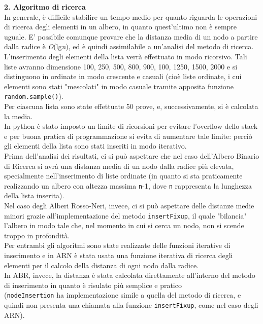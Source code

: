 \documentclass[]{article}
\begin{document}
{\Large \textbf{2. Algoritmo di ricerca}}\\
In generale, è difficile stabilire un tempo medio per quanto riguarda le operazioni di ricerca degli elementi in un albero, 
in quanto quest'ultimo non è sempre uguale. E' possibile comunque provare che la distanza media di un nodo a partire dalla radice è \textit{O}(lg\textit{n}), 
ed è quindi assimilabile a un'analisi del metodo di ricerca.\\
L'inserimento degli elementi della lista verrà effettuato in modo ricorsivo. 
Tali liste avranno dimensione 100, 250, 500, 800, 900, 100, 1250, 1500, 2000 e si distinguono in ordinate in modo crescente e casuali 
(cioè liste ordinate, i cui elementi sono stati "mescolati" in modo casuale tramite apposita funzione \texttt{random.sample()}).\\
Per ciascuna lista sono state effettuate 50 prove, e, successivamente, si è calcolata la media.\\
In python è stato imposto un limite di ricorsioni per evitare l'overflow dello stack e per buona pratica di programmazione si evita di aumentare tale limite:
perciò gli elementi della lista sono stati inseriti in modo iterativo.\\
Prima dell'analisi dei risultati, ci si può aspettare che nel caso dell'Albero Binario di Ricerca si avrà una distanza media di un nodo dalla radice più elevata, 
specialmente nell'inserimento di liste ordinate (in quanto si sta praticamente realizzando un albero con altezza massima \texttt{n}-1, dove \texttt{n} rappresenta la lunghezza della lista inserita).\\
Nel caso degli Alberi Rosso-Neri, invece, ci si può aspettare delle distanze medie minori grazie all'implementazione del metodo \texttt{insertFixup}, 
il quale "bilancia" l'albero in modo tale che, nel momento in cui si cerca un nodo, non si scende troppo in profondità.\\ 
Per entrambi gli algoritmi sono state realizzate delle funzioni iterative di inserimento e in ARN è stata usata una funzione iterativa di ricerca degli elementi per il calcolo della distanza di ogni nodo dalla radice.\\
In ABR, invece, la distanza è stata calcolata direttamente all'interno del metodo di inserimento in quanto è risulato più semplice e pratico 
\\(\texttt{nodeInsertion} ha implementazione simile a quella del metodo di ricerca, e quindi non presenta una chiamata alla funzione \texttt{insertFixup}, come nel caso degli ARN).\\
\end{document}
